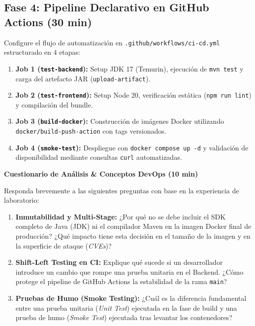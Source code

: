 \documentclass[10pt,letterpaper]{article}
\newcommand{\sectionBadge}[1]{%
  \refstepcounter{section}%
  \vspace{0.24cm}%
  \noindent%
  \colorbox{icesiBlue}{\color{white}\rule[-0.08cm]{0pt}{0.42cm}\hspace{0.16cm}\textbf{\normalsize \thesection}\hspace{0.16cm}}%
  \hspace{0.18cm}%
  {\fontsize{9.5}{12}\selectfont\textbf{\color{icesiDark}#1}}\\[-0.10cm]%
  \noindent{\color{icesiDark}\rule{\textwidth}{0.8pt}}\vspace{0.10cm}%
}
\begin{document}
\newpage

\subsection{Fase 4: Pipeline Declarativo en GitHub Actions (30 min)}
Configure el flujo de automatización en \texttt{.github/workflows/ci-cd.yml} estructurado en 4 etapas:
\begin{enumerate}[leftmargin=*,label=\textbf{\alph*)},itemsep=2.5pt,topsep=2pt]
  \item \textbf{Job 1 (\texttt{test-backend}):} Setup JDK 17 (Temurin), ejecución de \texttt{mvn test} y carga del artefacto JAR (\texttt{upload-artifact}).
  \item \textbf{Job 2 (\texttt{test-frontend}):} Setup Node 20, verificación estática (\texttt{npm run lint}) y compilación del bundle.
  \item \textbf{Job 3 (\texttt{build-docker}):} Construcción de imágenes Docker utilizando \texttt{docker/build-push-action} con tags versionados.
  \item \textbf{Job 4 (\texttt{smoke-test}):} Despliegue con \texttt{docker compose up -d} y validación de disponibilidad mediante consultas \texttt{curl} automatizadas.
\end{enumerate}

\vspace{0.18cm}

\sectionBadge{Cuestionario de Análisis \& Conceptos DevOps (10 min)}

Responda brevemente a las siguientes preguntas con base en la experiencia de laboratorio:
\begin{enumerate}[leftmargin=*,label=\textbf{\arabic*.},itemsep=4pt,topsep=3pt]
  \item \textbf{Inmutabilidad y Multi-Stage:} ¿Por qué no se debe incluir el SDK completo de Java (JDK) ni el compilador Maven en la imagen Docker final de producción? ¿Qué impacto tiene esta decisión en el tamaño de la imagen y en la superficie de ataque (\textit{CVEs})?
  \item \textbf{Shift-Left Testing en CI:} Explique qué sucede si un desarrollador introduce un cambio que rompe una prueba unitaria en el Backend. ¿Cómo protege el pipeline de GitHub Actions la estabilidad de la rama \texttt{main}?
  \item \textbf{Pruebas de Humo (Smoke Testing):} ¿Cuál es la diferencia fundamental entre una prueba unitaria (\textit{Unit Test}) ejecutada en la fase de build y una prueba de humo (\textit{Smoke Test}) ejecutada tras levantar los contenedores?
\end{enumerate}
\end{document}
